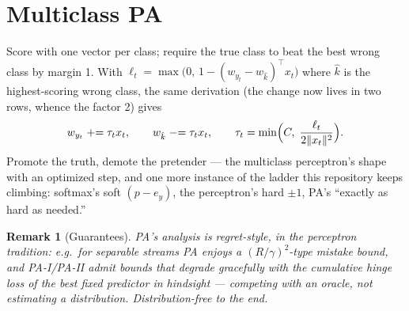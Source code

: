 \documentclass[11pt]{article}
\newtheorem{remark}{Remark}
\begin{document}
\section{Multiclass PA}

Score with one vector per class; require the true class to beat the best
wrong class by margin 1. With
$\ell_t = \max\bigl(0,\, 1 - (w_{y_t} - w_{\hat k})^\top x_t\bigr)$ where
$\hat k$ is the highest-scoring wrong class, the same derivation (the
change now lives in two rows, whence the factor 2) gives
\begin{equation}
  w_{y_t} \mathrel{+}= \tau_t x_t,
  \qquad
  w_{\hat k} \mathrel{-}= \tau_t x_t,
  \qquad
  \tau_t = \min\Bigl(C,\; \frac{\ell_t}{2\lVert x_t\rVert^2}\Bigr).
  \label{eq:pamulti}
\end{equation}
Promote the truth, demote the pretender --- the multiclass perceptron's
shape with an optimized step, and one more instance of the ladder this
repository keeps climbing: softmax's soft $(p - e_y)$, the perceptron's
hard $\pm 1$, PA's ``exactly as hard as needed.''

\begin{remark}[Guarantees]
PA's analysis is regret-style, in the perceptron tradition: e.g.\ for
separable streams PA enjoys a $(R/\gamma)^2$-type mistake bound, and
PA-I/PA-II admit bounds that degrade gracefully with the cumulative
hinge loss of the best fixed predictor in hindsight --- competing with an
oracle, not estimating a distribution. Distribution-free to the end.
\end{remark}
\end{document}

